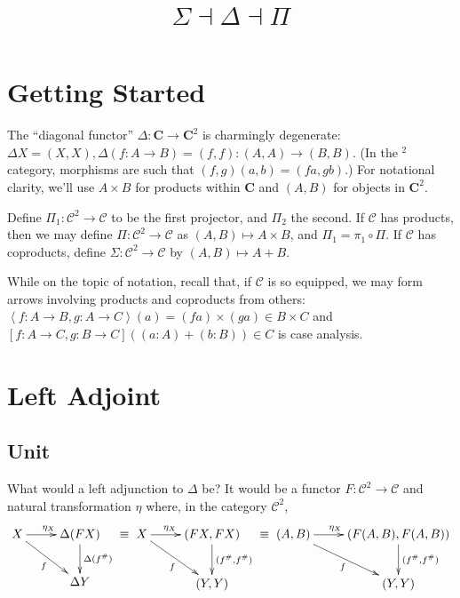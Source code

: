 \documentclass[letterpaper]{article}
\title{$\Sigma \dashv \Delta \dashv \Pi$}
\newcommand{\brak}[1]{\left[{#1}\right]}
\newcommand{\ang}[1]{\left\langle{#1}\right\rangle}
\begin{document}
\maketitle

\section{Getting Started}

The ``diagonal functor'' $\Delta : \mathbf{C} \to \mathbf{C}^2$ is
charmingly degenerate:
$\Delta X = (X,X), \Delta (f : A \to B) = (f,f) : (A,A) \to (B,B)$.
(In the ${}^2$ category, morphisms are such that $(f,g)(a,b) = (f a,g b)$.)
For notational clarity, we'll use $A \times B$ for products within
$\mathbf{C}$ and $(A,B)$ for objects in $\mathbf{C}^2$. 

Define $\Pi_1 : \mathcal{C}^2 \to \mathcal{C}$ to be the first
projector, and $\Pi_2$ the second.  If $\mathcal{C}$ has
products, then we may define $\Pi : \mathcal{C}^2 \to \mathcal{C}$ as
$(A,B) \mapsto A \times B$, and $\Pi_1 = \pi_1 \circ \Pi$.
If $\mathcal{C}$ has coproducts, define $\Sigma : \mathcal{C}^2 \to
\mathcal{C}$ by $(A,B) \mapsto A + B$.

While on the topic of notation, recall that, if $\mathcal{C}$ is so
equipped, we may form arrows involving products and coproducts from others:
$\ang{f : A \to B,g : A \to C}(a) = (f a) \times (g a) \in B \times C$ and
$\brak{f : A \to C,g : B \to C}((a : A) + (b : B)) \in C$ is case analysis.

\section{Left Adjoint}
\subsection{Unit}

What would a left adjunction to $\Delta$ be?  It would be a functor $F :
\mathcal{C}^2 \to \mathcal{C}$ and natural transformation $\eta$ where, in
the category $\mathcal{C}^2$,
\[ \xymatrix{
	X \ar[r]^{\eta_X} \ar[rd]_{f} & \Delta (F X) \ar[d]^{\Delta (f^\#)} \\
                                  & \Delta Y
} \equiv \xymatrix {
	X \ar[r]^(.4){\eta_X} \ar[rd]_{f} & (F X, F X) \ar[d]^{(f^\#, f^\#)} \\
                                  & (Y, Y)
} \equiv \xymatrix {
	(A,B) \ar[r]^(.4){\eta_X} \ar[rd]_{f} & (F (A,B), F (A,B)) \ar[d]^{(f^\#, f^\#)} \\
                                  & (Y, Y)
}  \]
\end{document}
